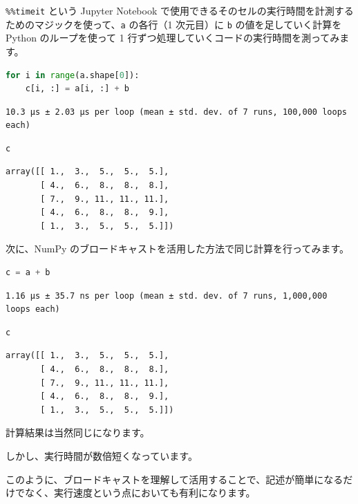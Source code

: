 \texttt{\%\%timeit} という Jupyter Notebook で使用できるそのセルの実行時間を計測するためのマジックを使って、\texttt{a} の各行（1 次元目）に \texttt{b} の値を足していく計算を Python のループを使って 1 行ずつ処理していくコードの実行時間を測ってみます。


\begin{lstlisting}[style=codecell,language=Python]
%%timeit
for i in range(a.shape[0]):
    c[i, :] = a[i, :] + b
\end{lstlisting}

\begin{lstlisting}[style=outputcell]
10.3 µs ± 2.03 µs per loop (mean ± std. dev. of 7 runs, 100,000 loops each)
\end{lstlisting}

\begin{lstlisting}[style=codecell,language=Python]
c
\end{lstlisting}

\begin{lstlisting}[style=outputcell]
array([[ 1.,  3.,  5.,  5.,  5.],
       [ 4.,  6.,  8.,  8.,  8.],
       [ 7.,  9., 11., 11., 11.],
       [ 4.,  6.,  8.,  8.,  9.],
       [ 1.,  3.,  5.,  5.,  5.]])
\end{lstlisting}

次に、NumPy のブロードキャストを活用した方法で同じ計算を行ってみます。


\begin{lstlisting}[style=codecell,language=Python]
%%timeit
c = a + b
\end{lstlisting}

\begin{lstlisting}[style=outputcell]
1.16 µs ± 35.7 ns per loop (mean ± std. dev. of 7 runs, 1,000,000 loops each)
\end{lstlisting}

\begin{lstlisting}[style=codecell,language=Python]
c
\end{lstlisting}

\begin{lstlisting}[style=outputcell]
array([[ 1.,  3.,  5.,  5.,  5.],
       [ 4.,  6.,  8.,  8.,  8.],
       [ 7.,  9., 11., 11., 11.],
       [ 4.,  6.,  8.,  8.,  9.],
       [ 1.,  3.,  5.,  5.,  5.]])
\end{lstlisting}

計算結果は当然同じになります。

しかし、実行時間が数倍短くなっています。


このように、ブロードキャストを理解して活用することで、記述が簡単になるだけでなく、実行速度という点においても有利になります。


